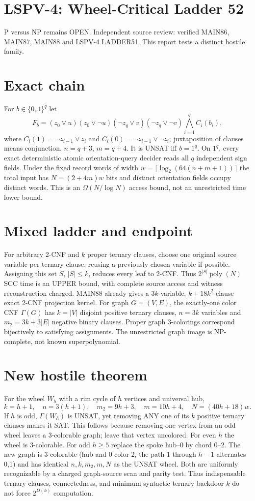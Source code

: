 \documentclass{article}
\begin{document}
\section*{LSPV-4: Wheel-Critical Ladder 52}
P versus NP remains OPEN. Independent source review: verified MAIN86, MAIN87, MAIN88 and LSPV-4 LADDER51. This report tests a distinct hostile family.
\section*{Exact chain}
For $b\in\{0,1\}^q$ let
\[
F_b=(z_0\vee u)(z_0\vee\neg u)(\neg z_q\vee v)(\neg z_q\vee\neg v)\bigwedge_{i=1}^qC_i(b_i),
\]
where $C_i(1)=\neg z_{i-1}\vee z_i$ and $C_i(0)=\neg z_{i-1}\vee\neg z_i$; juxtaposition of clauses means conjunction.
$n=q+3$, $m=q+4$. It is UNSAT iff $b=1^q$. On $1^q$, every exact deterministic atomic orientation-query decider reads all $q$ independent sign fields. Under the fixed record words of width $w=\lceil\log_2(64(n+m+1))\rceil$ the total input has $N=(2+4m)w$ bits and distinct orientation fields occupy distinct words. This is an $\Omega(N/\log N)$ access bound, not an unrestricted time lower bound.
\section*{Mixed ladder and endpoint}
For arbitrary 2-CNF and $k$ proper ternary clauses, choose one original source variable per ternary clause, reusing a previously chosen variable if possible. Assigning this set $S$, $|S|\le k$, reduces every leaf to 2-CNF. Thus $2^{|S|}\operatorname{poly}(N)$ SCC time is an UPPER bound, with complete source access and witness reconstruction charged. MAIN88 already gives a $3k$-variable, $k+18k^2$-clause exact 2-CNF projection kernel. For graph $G=(V,E)$, the exactly-one color CNF $\Gamma(G)$ has $k=|V|$ disjoint positive ternary clauses, $n=3k$ variables and $m_2=3k+3|E|$ negative binary clauses. Proper graph 3-colorings correspond bijectively to satisfying assignments. The unrestricted graph image is NP-complete, not known superpolynomial.
\section*{New hostile theorem}
For the wheel $W_h$ with a rim cycle of $h$ vertices and universal hub,
\[
k=h+1,\quad n=3(h+1),\quad m_2=9h+3,\quad m=10h+4,\quad N=(40h+18)w.
\]
If $h$ is odd, $\Gamma(W_h)$ is UNSAT, yet removing ANY one of its $k$ positive ternary clauses makes it SAT. This follows because removing one vertex from an odd wheel leaves a 3-colorable graph; leave that vertex uncolored. For even $h$ the wheel is 3-colorable. For odd $h\ge5$ replace the spoke hub--0 by chord 0--2. The new graph is 3-colorable (hub and 0 color 2, the path 1 through $h-1$ alternates 0,1) and has identical $n,k,m_2,m,N$ as the UNSAT wheel. Both are uniformly recognizable by a charged graph-source scan and parity test. Thus indispensable ternary clauses, connectedness, and minimum syntactic ternary backdoor $k$ do not force $2^{\Omega(k)}$ computation.
\end{document}
